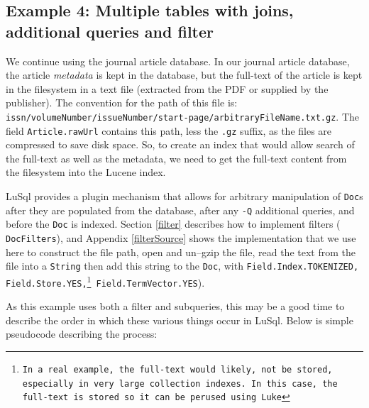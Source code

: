 



\subsection[Example 4]{Example 4: Multiple tables with joins, additional
  queries and filter}
\label{example4}
We continue using the journal article database.
In our journal article database, the article {\em metadata} is kept in the
database, but the full-text of the article is kept in the filesystem in a text
file (extracted from the PDF or supplied by the publisher).
The convention for the path of this file is:\\
{\tt issn/volumeNumber/issueNumber/start-page/arbitraryFileName.txt.gz}.
The field {\tt Article.rawUrl} contains this path, less the {\tt .gz} suffix,
as the files are compressed to save disk space.
So, to create an index that would allow search of the full-text as well as the
metadata, we need to get the full-text content from the filesystem into the 
Lucene index.

LuSql provides a plugin mechanism that allows for arbitrary manipulation of
{\tt Doc}s after they are populated from the database, after any 
{\tt  -Q} additional queries, and before the {\tt Doc} is indexed.
Section \ref{filter} describes how to implement filters ({\tt
  DocFilters}), and Appendix \ref{filterSource} shows the implementation
that we use here to construct the file path, open and un--gzip the file,
read the text from the file into a {\tt String} then add this string 
to the {\tt Doc}, with {\tt Field.Index.TOKENIZED,
Field.Store.YES,\footnote{In a real example, the full-text would likely, not be
  stored, especially in very large collection indexes. In this case, the
  full-text is stored so it can be perused using Luke} Field.TermVector.YES}). 


As this example uses both a filter and subqueries, this may be a good time to
describe the order in which these various things occur in LuSql.
Below is simple pseudocode describing the process:

